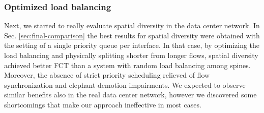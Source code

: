 \subsubsection{Optimized load balancing}
Next, we started to really evaluate spatial diversity in the data center network. In Sec.  \ref{sec:final-comparison} the best results for spatial diversity were obtained with the setting of a single priority queue per interface. In that case, by optimizing the load balancing and physically splitting shorter from longer flows, spatial diversity achieved better FCT than a system with random load balancing among spines. Moreover, the absence of strict priority scheduling relieved of flow synchronization and elephant demotion impairments. We expected to observe similar benefits also in the real data center network, however we discovered some shortcomings that make our approach ineffective in most cases. \\
